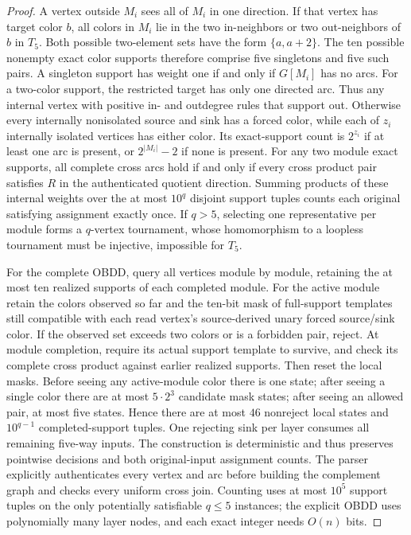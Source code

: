 \documentclass[11pt]{article}
\begin{document}
\begin{proof}
A vertex outside $M_i$ sees all of $M_i$ in one direction. If that
vertex has target color $b$, all colors in $M_i$ lie in the two
in-neighbors or two out-neighbors of $b$ in $T_5$.
Both possible two-element sets have the form $\{a,a+2\}$.
The ten possible nonempty exact color supports therefore comprise
five singletons and five such pairs. A singleton support has weight
one if and only if $G[M_i]$ has no arcs.
For a two-color support, the restricted target has only one
directed arc. Thus any internal vertex with positive in- and outdegree
rules that support out. Otherwise every internally nonisolated source
and sink has a forced color, while each of $z_i$ internally isolated
vertices has either color. Its exact-support count is $2^{z_i}$
if at least one arc is present, or $2^{|M_i|}-2$ if none is present.
For any two module exact supports, all complete cross arcs hold if
and only if every cross product pair satisfies $R$ in the
authenticated quotient direction. Summing products of these
internal weights over the at most $10^q$ disjoint support tuples
counts each original satisfying assignment exactly once.
If $q>5$, selecting one representative per module forms a
$q$-vertex tournament, whose homomorphism to a loopless tournament
must be injective, impossible for $T_5$.

For the complete OBDD, query all vertices module by module, retaining
the at most ten realized supports of each completed module.
For the active module retain the colors observed so far and the
ten-bit mask of full-support templates still compatible with each
read vertex's source-derived unary forced source/sink color.
If the observed set exceeds two colors or is a forbidden pair, reject.
At module completion, require its actual support template to survive,
and check its complete cross product against earlier realized supports.
Then reset the local masks. Before seeing any active-module color
there is one state; after seeing a single color there are at most
$5\cdot 2^3$ candidate mask states; after seeing an allowed pair,
at most five states. Hence there are at most $46$ nonreject
local states and $10^{q-1}$ completed-support tuples.
One rejecting sink per layer consumes all remaining five-way inputs.
The construction is deterministic and thus preserves pointwise
decisions and both original-input assignment counts.
The parser explicitly authenticates every vertex and arc before
building the complement graph and checks every uniform cross join.
Counting uses at most $10^5$ support tuples on the only potentially
satisfiable $q\le5$ instances; the explicit OBDD uses polynomially
many layer nodes, and each exact integer needs $O(n)$ bits.
\end{proof}
\end{document}
